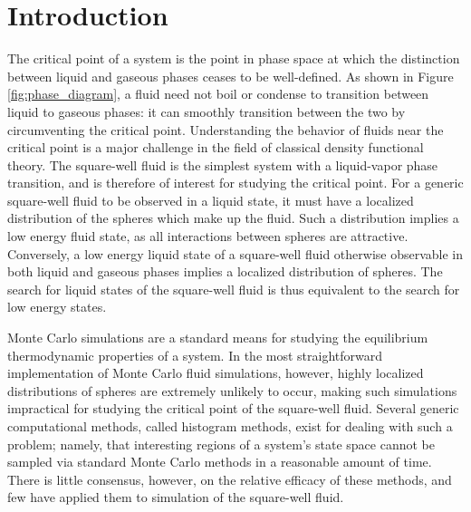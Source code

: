 \documentclass[11pt]{article}
\begin{document}
\newpage

\tableofcontents

\thispagestyle{empty}

\newpage



\thispagestyle{empty}

\newpage

\pagestyle{fancy}
\setlength\parindent{5mm}
\setcounter{page}{1}

\section{Introduction}
\label{sec:intro}

The critical point of a system is the point in phase space at which
the distinction between liquid and gaseous phases ceases to be
well-defined. As shown in Figure \ref{fig:phase_diagram}, a fluid need
not boil or condense to transition between liquid to gaseous phases:
it can smoothly transition between the two by circumventing the
critical point. Understanding the behavior of fluids near the critical
point is a major challenge in the field of classical density
functional theory. The square-well fluid is the simplest system with a
liquid-vapor phase transition, and is therefore of interest for
studying the critical point. For a generic square-well fluid to be
observed in a liquid state, it must have a localized distribution of
the spheres which make up the fluid. Such a distribution implies a low
energy fluid state, as all interactions between spheres are
attractive. Conversely, a low energy liquid state of a square-well
fluid otherwise observable in both liquid and gaseous phases implies a
localized distribution of spheres. The search for liquid states of the
square-well fluid is thus equivalent to the search for low energy
states.

Monte Carlo simulations are a standard means for studying the
equilibrium thermodynamic properties of a system. In the most
straightforward implementation of Monte Carlo fluid simulations,
however, highly localized distributions of spheres are extremely
unlikely to occur, making such simulations impractical for studying
the critical point of the square-well fluid. Several generic
computational methods, called histogram methods, exist for dealing
with such a problem; namely, that interesting regions of a system's
state space cannot be sampled via standard Monte Carlo methods in a
reasonable amount of time. There is little consensus, however, on the
relative efficacy of these methods, and few have applied them to
simulation of the square-well fluid.
\end{document}
